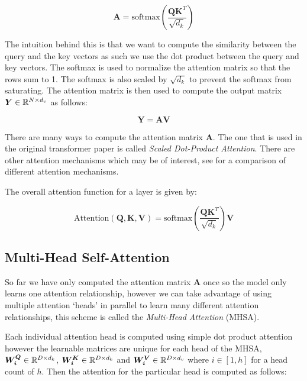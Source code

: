 \documentclass[../main.tex]{subfiles}
\begin{document}
\begin{equation}
    \bm{A} = \text{softmax}\left(\frac{\bm{Q}\bm{K}^T}{\sqrt{d_k}}\right)
\end{equation}

\noi The intuition behind this is that we want to compute the similarity between the query and the key vectors as such we use the dot product between the query and key vectors. The softmax is used to normalize the attention matrix so that the rows sum to 1. The softmax is also scaled by $\sqrt{d_k}$ to prevent the softmax from saturating. The attention matrix is then used to compute the output matrix $\bm{Y} \in \mathbb{R}^{N \times d_v}$ as follows:

\begin{equation}
    \bm{Y} = \bm{A}\bm{V}
\end{equation}

\begin{note}

There are many ways to compute the attention matrix $\bm{A}$. The one that is used in the original transformer paper is called \emph{Scaled Dot-Product Attention}. There are other attention mechanisms which may be of interest, see \cite{weng2018attention} for a comparison of different attention mechanisms.

\end{note}

The overall attention function for a layer is given by:

\begin{equation}
    \text{Attention}(\bm{Q}, \bm{K}, \bm{V}) = \text{softmax}\left(\frac{\bm{Q}\bm{K}^T}{\sqrt{d_k}}\right)\bm{V}
\end{equation}

\subsection{Multi-Head Self-Attention}

So far we have only computed the attention matrix $\bm{A}$ once so the model only learns one attention relationship, however we can take advantage of using multiple attention `heads' in parallel to learn many different attention relationships, this scheme is called the \emph{Multi-Head Attention} (MHSA). 

Each individual attention head is computed using simple dot product attention however the learnable matrices are unique for each head of the MHSA, $\bm{W^Q_i} \in \mathbb{R}^{D \times d_k}$, $\bm{W^K_i} \in \mathbb{R}^{D \times d_k}$ and $\bm{W^V_i} \in \mathbb{R}^{D \times d_v}$ where $i \in [1, h]$ for a head count of $h$. Then the attention for the particular head is computed as follows:
\end{document}
